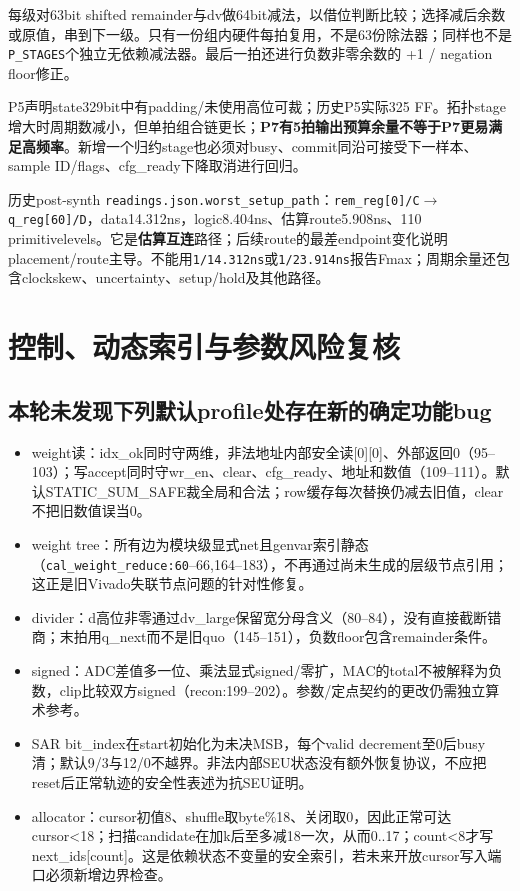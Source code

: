 \documentclass[UTF8,fontset=fandol,10pt,a4paper,openany]{ctexrep}
\newcommand{\code}[1]{\nolinkurl{#1}}
\begin{document}
每级对63bit shifted remainder与dv做64bit减法，以借位判断比较；选择减后余数或原值，串到下一级。只有一份组内硬件每拍复用，不是63份除法器；同样也不是\code{P_STAGES}个独立无依赖减法器。最后一拍还进行负数非零余数的 +1 / negation floor修正。


P5声明state329bit中有padding/未使用高位可裁；历史P5实际325 FF。拓扑stage增大时周期数减小，但单拍组合链更长；\textbf{P7有5拍输出预算余量不等于P7更易满足高频率}。新增一个归约stage也必须对busy、commit同沿可接受下一样本、sample ID/flags、cfg\_ready下降取消进行回归。


历史post-synth \code{readings.json.worst_setup_path}：\code{rem_reg[0]/C}\ensuremath{\rightarrow}\code{q_reg[60]/D}，data14.312ns，logic8.404ns、估算route5.908ns、110 primitivelevels。它是\textbf{估算互连}路径；后续route的最差endpoint变化说明placement/route主导。不能用\code{1/14.312ns}或\code{1/23.914ns}报告Fmax；周期余量还包含clockskew、uncertainty、setup/hold及其他路径。


\section{控制、动态索引与参数风险复核}


\subsection{本轮未发现下列默认profile处存在新的确定功能bug}


\begin{itemize}
\item weight读：idx\_ok同时守两维，非法地址内部安全读[0][0]、外部返回0（95–103）；写accept同时守wr\_en、clear、cfg\_ready、地址和数值（109–111）。默认STATIC\_SUM\_SAFE裁全局和合法；row缓存每次替换仍减去旧值，clear不把旧数值误当0。
\item weight tree：所有边为模块级显式net且genvar索引静态（\code{cal_weight_reduce:60}–66,164–183），不再通过尚未生成的层级节点引用；这正是旧Vivado失联节点问题的针对性修复。
\item divider：d高位非零通过dv\_large保留宽分母含义（80–84），没有直接截断错商；末拍用q\_next而不是旧quo（145–151），负数floor包含remainder条件。
\item signed：ADC差值多一位、乘法显式signed/零扩，MAC的total不被解释为负数，clip比较双方signed（recon:199–202）。参数/定点契约的更改仍需独立算术参考。
\item SAR bit\_index在start初始化为未决MSB，每个valid decrement至0后busy清；默认9/3与12/0不越界。非法内部SEU状态没有额外恢复协议，不应把reset后正常轨迹的安全性表述为抗SEU证明。
\item allocator：cursor初值8、shuffle取byte\%18、关闭取0，因此正常可达cursor<18；扫描candidate在加k后至多减18一次，从而0..17；count<8才写next\_ids[count]。这是依赖状态不变量的安全索引，若未来开放cursor写入端口必须新增边界检查。
\end{itemize}
\end{document}
